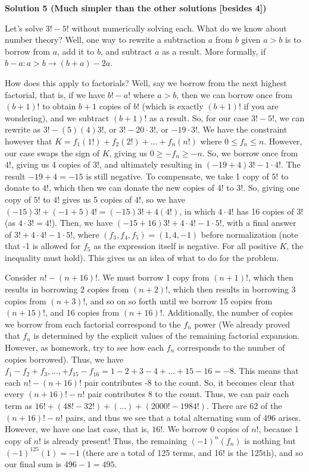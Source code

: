 \begin{enumerate}
 



\textbf{Solution 5 (Much simpler than the other solutions [besides 4])}

Let's solve $3! - 5!$ without numerically solving each. What do we know about number theory? Well, one way to rewrite a subtraction $a$ from $b$ given $a > b$ is to borrow from $a$, add it to $b$, and subtract $a$ as a result. More formally, if $b - a : a > b \rightarrow (b + a) - 2a$.

 How does this apply to factorials? Well, say we borrow from the next highest factorial, that is, if we have $b! - a!$ where $a > b$, then we can borrow once from $(b+1)!$ to obtain $b+1$ copies of $b!$ (which is exactly $(b+1)!$ if you are wondering), and we subtract $(b+1)!$ as a result. So, for our case $3! - 5!$, we can rewrite as $3! - (5)(4)3!$, or $3! - 20 \cdot 3!$, or $-19 \cdot 3!$. We have the constraint however that $K = f_1(1!) + f_2(2!) + ... + f_n(n!)$ where $0 \le f_n \le n$. However, our case swaps the sign of $K$, giving us $0 \ge -f_n \ge -n$. So, we borrow once from $4!$, giving us 4 copies of $3!$, and ultimately resulting in $(-19 + 4)3! - 1 \cdot 4!$. The result $-19 + 4 = -15$ is still negative. To compensate, we take 1 copy of $5!$ to donate to $4!$, which then we can donate the new copies of $4!$ to $3!$. So, giving one copy of $5!$ to $4!$ gives us 5 copies of $4!$, so we have $(-15)3! + (-1 + 5)4! = (-15)3! + 4(4!)$, in which $4 \cdot 4!$ has 16 copies of $3!$ (as $4 \cdot 3! = 4!$). Then, we have $(-15 + 16)3! + 4 \cdot 4! - 1 \cdot 5!$, with a final answer of $3! + 4 \cdot 4! - 1 \cdot 5!$, where $(f_3, f_4, f_5) = (1, 4, -1)$ before normalization (note that -1 is allowed for $f_5$ as the expression itself is negative. For all positive $K$, the inequality must hold). This gives us an idea of what to do for the problem.

 Consider $n! - (n+16)!$. We must borrow 1 copy from $(n+1)!$, which then results in borrowing 2 copies from $(n+2)!$, which then results in borrowing 3 copies from $(n+3)!$, and so on so forth until we borrow 15 copies from $(n+15)!$, and 16 copies from $(n+16)!$. Additionally, the number of copies we borrow from each factorial correspond to the $f_n$ power (We already proved that $f_n$ is determined by the explicit values of the remaining factorial expansion. However, as homework, try to see how each $f_n$ corresponds to the number of copies borrowed). Thus, we have $f_1 - f_2 + f_3, ..., + f_{15} - f_{16} = 1 - 2 + 3 - 4 + ... + 15 - 16 = -8$. This means that each $n! - (n+16)!$ pair contributes -8 to the count. So, it becomes clear that every $(n+16)! - n!$ pair contributes 8 to the count. Thus, we can pair each term as $16! + (48! - 32!) + (...) + (2000! - 1984!)$. There are 62 of the $(n+16)! - n!$ pairs, and thus we see that a total alternating sum of 496 arises. However, we have one last case, that is, $16!$. We borrow 0 copies of $n!$, because 1 copy of $n!$ is already present! Thus, the remaining $(-1)^n (f_n)$ is nothing but $(-1)^{125}(1) = -1$ (there are a total of 125 terms, and 16! is the 125th), and so our final sum is $496 - 1 = \boxed{495}$.


\end{enumerate}
